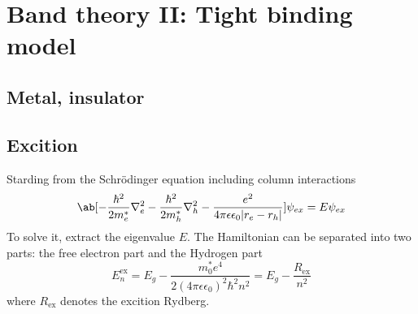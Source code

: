
\chapter{Band theory II: Tight binding model}

\section{Metal, insulator}

\section{Excition}

Starding from the Schr\"odinger equation including column interactions
\begin{equation}
  \ab[-\frac{\hbar^2}{2m_e^*}\nabla_e^2 - \frac{\hbar^2}{2m_h^*}\nabla_h^2
      - \frac{e^2}{4\pi\epsilon\epsilon_0|r_e - r_h|} ] \psi_{ex} = E\psi_{ex}
\end{equation}
To solve it, extract the eigenvalue $E$. The Hamiltonian can be separated into
two parts: the free electron part and the Hydrogen part
\begin{equation}
  E_n^\text{ex} = E_g - \frac{m_0^*e^4}{2(4\pi\epsilon\epsilon_0)^2 \hbar^2 n^2}
= E_g - \frac{R_\text{ex}}{n^2}
\end{equation}
where $R_\text{ex}$ denotes the excition Rydberg.
